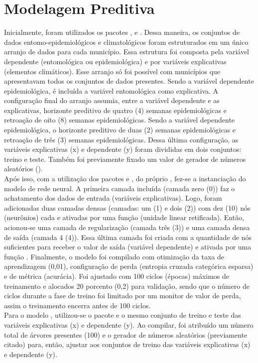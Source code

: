 \section{Modelagem Preditiva}

\indent Inicialmente, foram utilizados os pacotes ,  e  \cite{scikit-learn_2011_pedregosa, sklearn_2013_buitinck}. Dessa maneira, os conjuntos de dados entomo-epidemiológicos e climatológicos foram estruturados em um único arranjo de dados para cada município. Essa estrutura foi composta pela variável dependente (entomológica ou epidemiológica) e por variáveis explicativas (elementos climáticos). Esse arranjo só foi possível com municípios que apresentavam todos os conjuntos de dados presentes. Sendo a variável dependente epidemiológica, é incluída a variável entomológica como explicativa. A configuração final do arranjo assumia, entre a variável dependente e as explicativas, horizonte preditivo de quatro (4) semanas epidemiológicas e retroação de oito (8) semanas epidemiológicas. Sendo a variável dependente epidemiológica, o horizonte preditivo de duas (2) semanas epidemiológicas e retroação de três (3) semanas epidemiológicas. Dessa última configuração, as variáveis explicativas (x) e dependente (y) foram divididas em dois conjuntos: treino e teste. Também foi previamente fixado um valor de gerador de números aleatórios ().\\
\indent Após isso, com a utilização dos pacotes \cite{tensorflow_2015_whitepaper} e  \cite{keras_2015_chollet}, do próprio , fez-se a instanciação do modelo de rede neural. A primeira camada incluída (camada zero (0)) faz o achatamento dos dados de entrada (variáveis explicativas). Logo, foram adicionadas duas camadas densas (camadas: um (1) e dois (2)) com dez (10) nós (neurônios) cada e ativadas por uma função  (unidade linear retificada). Então, acionou-se uma camada de regularização (camada três (3)) e uma camada densa de saída (camada 4 (4)). Essa última camada foi criada com a quantidade de nós suficientes para receber o valor de saída (variável dependente) e ativada por uma função . Finalmente, o modelo foi compilado com otimização da taxa de aprendizagem (0,01), configuração de perda (entropia cruzada categórica esparsa) e de métrica (acurácia). Foi ajustado com 100 ciclos (épocas) máximos de treinamento e alocados 20 porcento (0,2) para validação, sendo que o número de ciclos durante a fase de treino foi limitado por um monitor de valor de perda, assim o treinamento encerra antes de 100 ciclos.\\
\indent Para o modelo , utilizou-se o pacote  e o mesmo conjunto de treino e teste das variáveis explicativas (x) e dependente (y). Ao compilar, foi atribuído um número total de árvores presentes (100) e o gerador de números aleatórios (previamente citado) para, então, ajustar aos conjuntos de treino das variáveis explicativas (x) e dependente (y).




